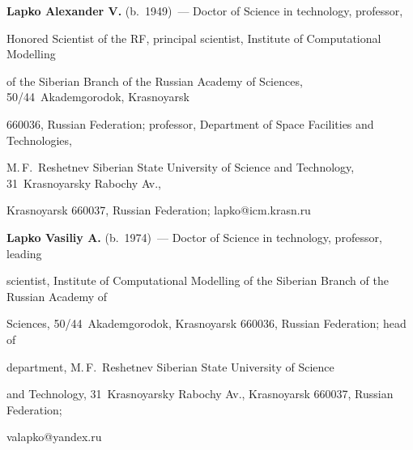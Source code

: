      


     \vspace*{3pt}


     


     \noindent


     \textbf{Lapko Alexander V.} (b.\ 1949)~--- Doctor of Science in technology, professor, 


Honored Scientist of the RF, principal scientist, Institute of Computational Modelling 


of the Siberian Branch of the Russian Academy of Sciences, 50/44~Akademgorodok, Krasnoyarsk 


660036, Russian Federation; professor, Department of Space Facilities and Technologies, 


M.\,F.~Reshetnev Siberian State University of Science and Technology, 31~Krasnoyarsky Rabochy Av., 


Krasnoyarsk 660037, Russian Federation; \mbox{lapko@icm.krasn.ru}


     


     \noindent


     \textbf{Lapko Vasiliy A.} (b.\ 1974)~--- Doctor of Science in technology, professor, leading 


scientist, Institute of Computational Modelling of the Siberian Branch of the Russian Academy of 


Sciences, 50/44~Akademgorodok, Krasnoyarsk 660036, Russian Federation; head of 


department, M.\,F.~Reshetnev Siberian State University of Science 


and Technology, 31~Krasnoyarsky Rabochy Av., Krasnoyarsk 660037, Russian Federation; 


valapko@yandex.ru





\label{end\stat}





\renewcommand{\bibname}{\protect\rm Литература} 


